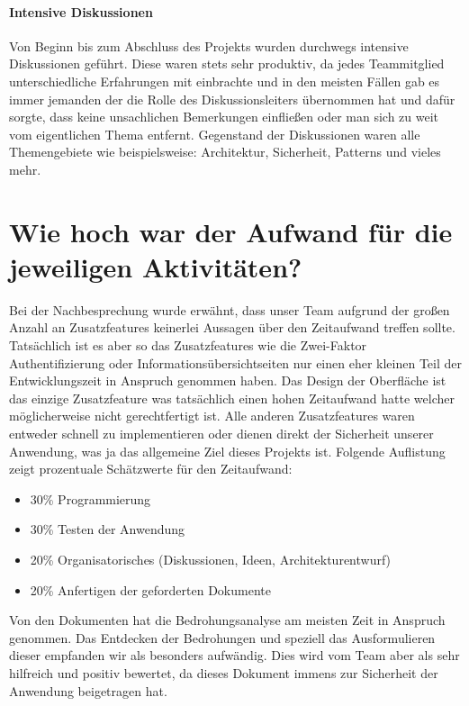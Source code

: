 \documentclass[12pt,DIV14,BCOR10mm,a4paper,parskip=half-,headsepline,headinclude,english,ngerman,bibliography=totocnumbered]{scrreprt}
\begin{document}
\paragraph{Intensive Diskussionen} Von Beginn bis zum Abschluss des Projekts wurden durchwegs intensive Diskussionen geführt. Diese waren stets sehr produktiv, da jedes Teammitglied unterschiedliche Erfahrungen mit einbrachte und in den meisten Fällen gab es immer jemanden der die Rolle des Diskussionsleiters übernommen hat und dafür sorgte, dass keine unsachlichen Bemerkungen einfließen oder man sich zu weit vom eigentlichen Thema entfernt. Gegenstand der Diskussionen waren alle Themengebiete wie beispielsweise: Architektur, Sicherheit, Patterns und vieles mehr.

\section{Wie hoch war der Aufwand für die jeweiligen Aktivitäten?}
Bei der Nachbesprechung wurde erwähnt, dass unser Team aufgrund der großen Anzahl an Zusatzfeatures keinerlei Aussagen über den Zeitaufwand treffen sollte. Tatsächlich ist es aber so das Zusatzfeatures wie die Zwei-Faktor Authentifizierung oder Informationsübersichtseiten nur einen eher kleinen Teil der Entwicklungszeit in Anspruch genommen haben. Das Design der Oberfläche ist das einzige Zusatzfeature was tatsächlich einen hohen Zeitaufwand hatte welcher möglicherweise nicht gerechtfertigt ist. Alle anderen Zusatzfeatures waren entweder schnell zu implementieren oder dienen direkt der Sicherheit unserer Anwendung, was ja das allgemeine Ziel dieses Projekts ist. Folgende Auflistung zeigt prozentuale Schätzwerte für den Zeitaufwand:

\begin{itemize}
  \item 30\% Programmierung
  \item 30\% Testen der Anwendung
  \item 20\% Organisatorisches (Diskussionen, Ideen, Architekturentwurf)
  \item 20\% Anfertigen der geforderten Dokumente
\end{itemize}

Von den Dokumenten hat die Bedrohungsanalyse am meisten Zeit in Anspruch genommen. Das Entdecken der Bedrohungen und speziell das Ausformulieren dieser empfanden wir als besonders aufwändig. Dies wird vom Team aber als sehr hilfreich und positiv bewertet, da dieses Dokument immens zur Sicherheit der Anwendung beigetragen hat.
\end{document}
